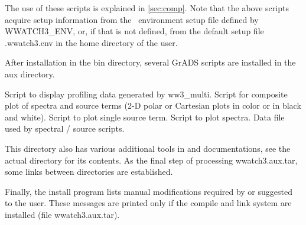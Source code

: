 \noindent
The use of these scripts is explained in \para\ref{sec:comp}.  Note that the
above scripts acquire setup information from the \ws\ environment setup file
defined by {\code WWATCH3\_ENV}, or, if that is not defined, from the default
setup file {\file .wwatch3.env} in the home directory of the user.

\noindent
After installation in the {\dir bin} directory, several GrADS scripts are
installed in the {\dir aux} directory.

\begin{flist}
      {Script to display profiling data generated by {\file
                       ww3\_multi}.} 
       {Script for composite plot of spectra and source
                       terms (2-D polar or Cartesian plots in color or in
                       black and white).}
      {Script to plot single source term.}
         {Script to plot spectra.}
   {Data file used by spectral / source scripts.}
\end{flist}

\noindent
This directory also has various additional tools in and documentations, see
the actual directory for its contents.  As the final step of processing {\file
wwatch3.aux.tar}, some links between directories are established.

Finally, the install program lists manual modifications required by or
suggested to the user. These messages are printed only if the compile and link
system are installed (file {\file wwatch3.aux.tar}).
